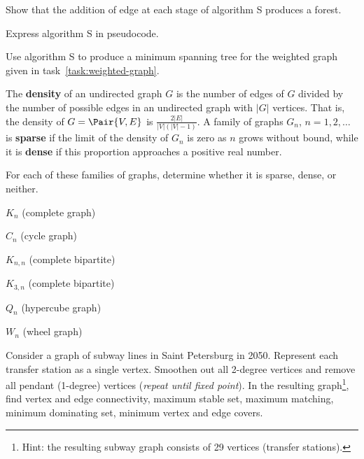 \documentclass[a4paper,12pt]{article}
\begin{document}
\begin{tasks}
    \begin{subtasks}
        \item Show that the addition of edge at each stage of algorithm S produces a forest.
        \item Express algorithm S in pseudocode.
        \item Use algorithm S to produce a minimum spanning tree for the weighted graph given in task~\ref{task:weighted-graph}.
    \end{subtasks}


    \item The \textbf{density} of an undirected graph $G$ is the number of edges
    of $G$ divided by the number of possible edges in an undirected
    graph with $|G|$ vertices.
    That is, the density of $G = \Pair{V, E}$ is $\frac{2 |E|}{|V| (|V| - 1)}$.
    A family of graphs $G_n$, $n = 1, 2, \dots$ is \textbf{sparse} if the limit of the density of $G_n$ is zero as $n$ grows without bound, while it is \textbf{dense} if this proportion approaches a positive real number.

    For each of these families of graphs, determine whether it is sparse, dense, or neither.

    \begin{multicols}{3}
    \begin{subtasks}
        \item $K_n$ (complete graph)
        \item $C_n$ (cycle graph)
        \item $K_{n,n}$ (complete bipartite)
        \item $K_{3,n}$ (complete bipartite)
        \item $Q_n$ (hypercube graph)
        \item $W_n$ (wheel graph)
    \end{subtasks}
    \end{multicols}


    \item Consider a graph of subway lines in Saint Petersburg in 2050.
    Represent each transfer station as a single vertex.
    Smoothen out all 2-degree vertices and remove all pendant (1-degree) vertices (\emph{repeat until fixed point}).
    In the resulting graph\footnote{Hint: the resulting subway graph consists of 29 vertices (transfer stations).}, find vertex and edge connectivity, maximum stable set, maximum matching, minimum dominating set, minimum vertex and edge covers.



\end{tasks}
\end{document}
